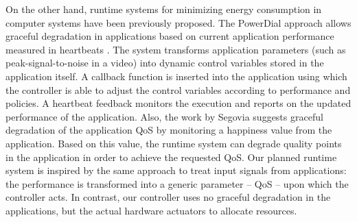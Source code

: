 \documentclass{article}
\begin{document}

On the other hand, runtime systems for minimizing energy consumption in computer systems have been previously proposed.
The PowerDial \cite{Hoffmann:11} approach allows graceful degradation in applications based on current application performance measured in heartbeats \cite{Hoffmann:10}. 
The system transforms application parameters (such as peak-signal-to-noise in a video) into dynamic control variables stored in the application itself. 
A callback function is inserted into the application using which the controller is able to adjust the control variables according to performance and policies.
A heartbeat feedback monitors the execution and reports on the updated performance of the application. 
Also, the work by Segovia \cite{Segovia:11} suggests graceful degradation of the application QoS by monitoring a happiness value from the application. 
Based on this value, the runtime system can degrade quality points in the application in order to achieve the requested QoS. 
Our planned runtime system is inspired by the same approach to treat input signals from applications: the performance is transformed into a generic parameter – QoS – upon which the controller acts.
In contrast, our controller uses no graceful degradation in the applications, but the actual hardware actuators to allocate resources.\smallskip
\end{document}

